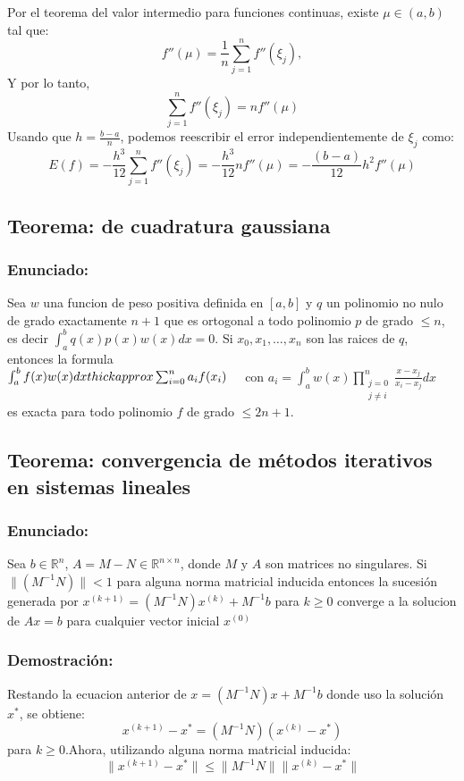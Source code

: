 \documentclass[a4paper,12pt]{article}
\begin{document}
Por el teorema del valor intermedio para funciones continuas, existe $\mu \in (a,b)$ tal que:
\[
f''(\mu) = \frac{1}{n}\sum_{j=1}^{n}f''(\xi_j),
\]
Y por lo tanto,
\[
\sum_{j=1}^{n}f''(\xi_j) = n f''(\mu)
\]
Usando que $h=\frac{b-a}{n}$, podemos reescribir el error independientemente de $\xi_j$ como:
\[
E(f) = -\frac{h^3}{12}\sum_{j=1}^{n}f''(\xi_j) = -\frac{h^3}{12}n f''(\mu) = -\frac{(b-a)}{12}h^2f''(\mu)
\]

\subsection{Teorema: de cuadratura gaussiana}
\subsubsection{Enunciado:}
Sea $w$ una funcion de peso positiva definida en $[a,b]$ y $q$ un polinomio no nulo de grado exactamente $n+1$ que es ortogonal a todo polinomio $p$ de grado $\leq n$, es decir $\int_a^b q(x)p(x)w(x)dx=0$. Si $x_0, x_1, \dots , x_n$ son las raices de $q$, entonces la formula\\
$\int_a^b f(x)w(x)dx \\thickapprox \sum_{i=0}^{n}a_if(x_i) \quad$ con $a_i=\int_a^bw(x)\prod_{\substack{j=0\\j\neq i}}^{n} \frac{x-x_j}{x_i-x_j}dx$\\
es exacta para todo polinomio $f$ de grado $\leq 2n+1$.

\subsection{Teorema: convergencia de métodos iterativos en sistemas lineales}
\subsubsection{Enunciado:}

Sea $b \in \mathbb{R}^n$, $A = M -N \in \mathbb{R}^{n\times n}$, donde $M$ y $A$ son matrices no singulares. Si $\parallel (M^{-1}N)\parallel<1$ para alguna norma matricial inducida entonces la sucesión generada por $x^{(k+1)}=(M^{-1}N)x^{(k)}+M^{-1}b$ para $k\geq 0$ converge a la solucion de $Ax=b$ para cualquier vector inicial $x^{(0)}$

\subsubsection{Demostración:}
Restando la ecuacion anterior de $x=(M^{-1}N)x+M^{-1}b$ donde uso la solución $x^*$, se obtiene:
\[
x^{(k+1)}-x^*=(M^{-1}N)(x^{(k)}-x^*) \] para $k\geq 0$.Ahora, utilizando alguna norma matricial inducida:
\[
\parallel x^{(k+1)}-x^*\parallel \leq \parallel M^{-1}N\parallel \parallel x^{(k)}-x^*\parallel\]
\end{document}
